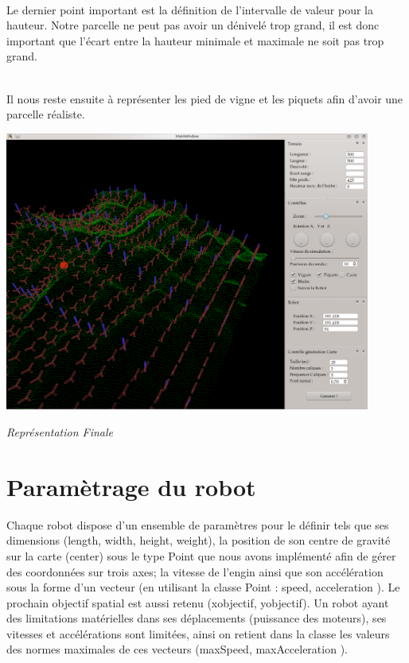 \documentclass[usenames,dvipsnames]{report}
\begin{document}
\\


    Le dernier point important est la définition de l'intervalle de valeur pour la hauteur. Notre parcelle ne peut pas avoir un dénivelé trop grand, il est donc important que l'écart entre la hauteur minimale et maximale ne soit pas trop grand.


\\
    Il nous reste ensuite à représenter les pied de vigne et les piquets afin d’avoir une parcelle réaliste.

     
    \includegraphics[width=12cm]{final.png}


    \textit{Représentation Finale} 

     
    \chapter{Paramètrage du robot}
    Chaque robot dispose d’un ensemble de paramètres pour le définir tels que ses dimensions (length, width, height, weight), 
    la position de son centre de gravité sur la carte (center) sous le type Point que nous avons implémenté afin de gérer des coordonnées sur trois axes; 
    la vitesse de l’engin ainsi que son accélération sous la forme d’un vecteur (en utilisant la classe Point : speed, acceleration ). 
    Le prochain objectif spatial est aussi retenu (xobjectif, yobjectif). Un robot ayant des limitations matérielles dans ses déplacements (puissance des moteurs), 
    ses vitesses et accélérations sont limitées, ainsi on retient dans la classe les valeurs des normes maximales de ces vecteurs (maxSpeed, maxAcceleration ).
\\
\end{document}
